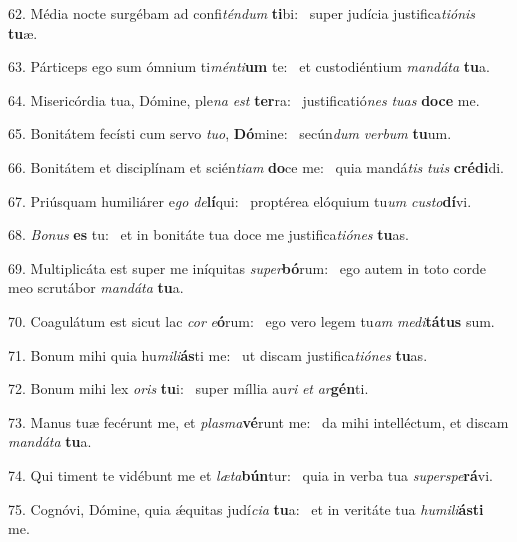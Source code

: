 62. Média nocte surgébam ad confi\textit{tén}\textit{dum} \textbf{ti}bi: \ast\  super judícia justifica\textit{ti}\textit{ó}\textit{nis} \textbf{tu}æ.\

63. Párticeps ego sum ómnium ti\textit{mén}\textit{ti}\textbf{um} te: \ast\  et custodiéntium \textit{man}\textit{dá}\textit{ta} \textbf{tu}a.\

64. Misericórdia tua, Dómine, ple\textit{na} \textit{est} \textbf{ter}ra: \ast\  justificatió\textit{nes} \textit{tu}\textit{as} \textbf{do}\textbf{ce} me.\

65. Bonitátem fecísti cum servo \textit{tu}\textit{o}, \textbf{Dó}mine: \ast\  secún\textit{dum} \textit{ver}\textit{bum} \textbf{tu}um.\

66. Bonitátem et disciplínam et scién\textit{ti}\textit{am} \textbf{do}ce me: \ast\  quia mandá\textit{tis} \textit{tu}\textit{is} \textbf{cré}\textbf{di}di.\

67. Priúsquam humiliárer e\textit{go} \textit{de}\textbf{lí}qui: \ast\  proptérea elóquium tu\textit{um} \textit{cus}\textit{to}\textbf{dí}vi.\

68. \textit{Bo}\textit{nus} \textbf{es} tu: \ast\  et in bonitáte tua doce me justifica\textit{ti}\textit{ó}\textit{nes} \textbf{tu}as.\

69. Multiplicáta est super me iníquitas \textit{su}\textit{per}\textbf{bó}rum: \ast\  ego autem in toto corde meo scrutábor \textit{man}\textit{dá}\textit{ta} \textbf{tu}a.\

70. Coagulátum est sicut lac \textit{cor} \textit{e}\textbf{ó}rum: \ast\  ego vero legem tu\textit{am} \textit{me}\textit{di}\textbf{tá}\textbf{tus} sum.\

71. Bonum mihi quia hu\textit{mi}\textit{li}\textbf{ás}ti me: \ast\  ut discam justifica\textit{ti}\textit{ó}\textit{nes} \textbf{tu}as.\

72. Bonum mihi lex \textit{o}\textit{ris} \textbf{tu}i: \ast\  super míllia au\textit{ri} \textit{et} \textit{ar}\textbf{gén}ti.\

73. Manus tuæ fecérunt me, et \textit{plas}\textit{ma}\textbf{vé}runt me: \ast\  da mihi intelléctum, et discam \textit{man}\textit{dá}\textit{ta} \textbf{tu}a.\

74. Qui timent te vidébunt me et \textit{læ}\textit{ta}\textbf{bún}tur: \ast\  quia in verba tua \textit{su}\textit{per}\textit{spe}\textbf{rá}vi.\

75. Cognóvi, Dómine, quia ǽquitas judí\textit{ci}\textit{a} \textbf{tu}a: \ast\  et in veritáte tua \textit{hu}\textit{mi}\textit{li}\textbf{ás}\textbf{ti} me.\

